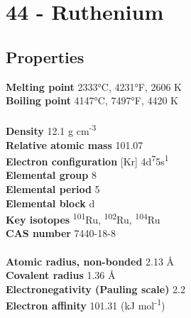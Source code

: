 \section{44 - Ruthenium}
\label{sec:elem-ruthenium}
\subsection{Properties}
\textbf{Melting point} 2333°C, 4231°F, 2606 K\\
\textbf{Boiling point} 4147°C, 7497°F, 4420 K\\
\\
\textbf{Density} 12.1 g cm\textsuperscript{-3}\\
\textbf{Relative atomic mass} 101.07\\
\textbf{Electron configuration} [Kr] 4d\textsuperscript{7}5s\textsuperscript{1}\\
\textbf{Elemental group} 8\\
\textbf{Elemental period} 5\\
\textbf{Elemental block} d\\
\textbf{Key isotopes} \textsuperscript{101}Ru, \textsuperscript{102}Ru, \textsuperscript{104}Ru\\
\textbf{CAS number} 7440-18-8\\
\\
\textbf{Atomic radius, non-bonded} 2.13 Å\\
\textbf{Covalent radius} 1.36 Å\\
\textbf{Electronegativity (Pauling scale)} 2.2\\
\textbf{Electron affinity} 101.31 (kJ mol\textsuperscript{-1})\\